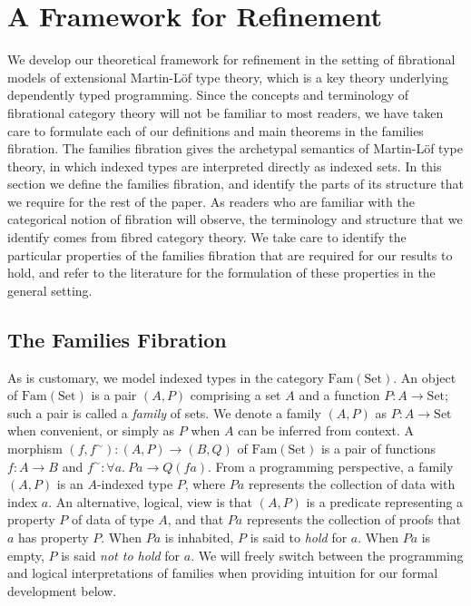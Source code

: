 \documentclass{LMCS}
\newcommand{\Fam}{\mathrm{Fam}}
\newcommand{\Set}{\mathrm{Set}}
\begin{document}
\section{A Framework for Refinement}\label{sec:families}

We develop our theoretical framework for refinement in the setting of
fibrational models of extensional Martin-L\"of type theory, which is a
key theory underlying dependently typed programming.  Since the
concepts and terminology of fibrational category theory will not be
familiar to most readers, we have taken care to formulate each of our
definitions and main theorems in the families fibration. The families
fibration gives the archetypal semantics of Martin-L\"of type theory,
in which indexed types are interpreted directly as indexed sets. In
this section we define the families fibration, and identify the parts
of its structure that we require for the rest of the paper. As readers
who are familiar with the categorical notion of fibration will
observe, the terminology and structure that we identify comes from
fibred category theory. We take care to identify the particular
properties of the families fibration that are required for our results
to hold, and refer to the literature for the formulation of these
properties in the general setting.

\subsection{The Families Fibration}

As is customary, we model indexed types in the category $\Fam(\Set)$.
An object of $\Fam(\Set)$ is a pair $(A,P)$ comprising a set $A$ and a
function $P : A \to \Set$; such a pair is called a {\em family} of
sets. We denote a family $(A,P)$ as $P : A \to \Set$ when convenient,
or simply as $P$ when $A$ can be inferred from context. A morphism
$(f,f^{\sim}) : (A,P) \to (B,Q)$ of $\Fam(\Set)$ is a pair of
functions $f : A \to B$ and $f^{\sim} : \forall a.\ P a \to Q(f
a)$. From a programming perspective, a family $(A,P)$ is an
$A$-indexed type $P$, where $P a$ represents the collection of data
with index $a$. An alternative, logical, view is that $(A,P)$ is a
predicate representing a property $P$ of data of type $A$, and that $P
a$ represents the collection of proofs that $a$ has property $P$. When
$P a$ is inhabited, $P$ is said to {\em hold} for $a$. When $P a$ is
empty, $P$ is said {\em not to hold} for $a$. We will freely switch
between the programming and logical interpretations of families when
providing intuition for our formal development below.
\end{document}
